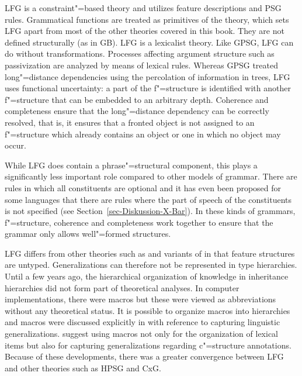 LFG is a constraint"=based theory and utilizes feature descriptions and PSG rules. Grammatical functions are treated
as primitives of the theory, which sets LFG apart from most of the other theories covered in this book. They are not defined structurally (as in GB). LFG is a lexicalist theory. Like GPSG, LFG can do without transformations. Processes affecting
argument structure such as passivization are analyzed by means of lexical rules. Whereas GPSG treated long"=distance dependencies using the percolation of information
in trees, LFG uses functional uncertainty: a part of the f"=structure is identified with another
f"=structure that can be embedded to an arbitrary depth. Coherence and completeness
ensure that the long"=distance dependency can be correctly resolved, that is, it ensures that a fronted object is not assigned to an f"=structure which already contains an object or one
in which no object may occur.

While LFG does contain a phrase"=structural component, this plays a significantly less important role compared to other models of grammar. There are rules in which all constituents are
optional and it has even been proposed for some languages that there are rules where the part of speech of the constituents is not specified (see Section~\ref{sec-Diskussion-X-Bar}).
In these kinds of grammars, f"=structure, coherence and completeness work together to ensure that the grammar only allows well"=formed structures.

LFG differs from other theories such as \hpsg and variants of \cxg in that feature structures are untyped. Generalizations can therefore not be represented in type hierarchies. 
Until a few years ago, the hierarchical organization of knowledge in inheritance hierarchies did not form part of theoretical analyses. In computer implementations,
there were macros but these were viewed as abbreviations without any theoretical status. It is possible to organize macros into hierarchies and macros were discussed explicitly
in  with reference to capturing linguistic generalizations. \citet*{ADT2008a} suggest using macros not only for the organization of lexical items but also for
capturing generalizations regarding c"=structure annotations. Because of these developments, there was a greater convergence between LFG and other theories such as HPSG and CxG.

